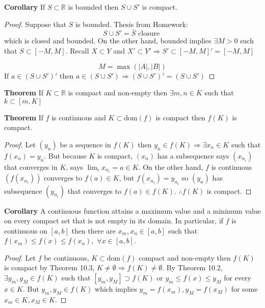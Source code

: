 \documentclass[10pt,letterpaper]{article}
\begin{document}
	\textbf{Corollary } If $S \subset \mathbb{R}$ is bounded then $S \cup S'$ is compact.
	\begin{proof}
		Suppose that $S$ is bounded. Thesis from Homework:
		$$S \cup S' = \bar{S} \text{ closure }$$
		which is closed and bounded. On the other hand, bounded implies $\exists M > 0$
		such that $S \subset [-M, M]$. Recall
		$X \subset Y$ and $X' \subset Y' \Rightarrow S' \subset [-M, M]' = [-M, M]$ \\
		$$M = \max(|A|, |B|)$$
		If $a \in (S \cup S')'$ then $a \in (S \cup S') \Rightarrow (S \cup S')' = (S \cup S')$
	\end{proof}
		
	{\color{purple}\textbf{Theorem} If $K \subset \mathbb{R}$ is compact and non-empty then 
	$\exists m, n \in K$ such that $k \subset [m, K]$}
	
	
	{\color{purple}\textbf{Theorem} If $f$ is continuous and $K \subset \mathrm{dom}(f)$ is compact
	then $f(K)$ is compact.}
	\begin{proof}
	Let $(y_n)$ be a sequence in $f(K)$ then $y_n \in f(K) \Rightarrow \exists x_n \in K$ such that
	$f(x_n) = y_n$. But because $K$ is compact, $(x_n)$ has a subsequence says $(x_{n_i})$ that 
	converges in $K$, says $\displaystyle\lim_{i}x_{n_i} = a \in K$. On the other hand, $f$ is continuous
	$(f(x_{n_i}))$ converges to $f(a) \in K$, but $f(x_{n_i}) = y_{n_i}$ so $(y_n)$ has subsequence
	$(y_{n_i})$ that converges to $f(a) \in f(K)$. $\therefore f(K)$ is compact.
	\end{proof}
	
	{\color{blue}\textbf{Corollary} 
		A continuous function attains a maximum value and a minimum value on every compact set that is not
		empty in its domain. In particular, if $f$ is continuous on $[a, b]$ then there are $x_m, x_n \in 
		[a, b]$ such that $f(x_{m}) \leq f(x) \leq f(x_n), \, \, \forall x \in [a, b]$.
	}
	\begin{proof}
		Let $f$ be continuous, $K \subset \mathrm{dom}(f)$ compact and non-empty then $f(K)$ is compact
		by Theorem 10.3, $K \neq \emptyset \Rightarrow f(K) \neq \emptyset$. By Theorem 10.2, 
		$\exists y_m, y_M \in f(K)$ such that $[y_m, y_M] \supset f(K)$ or $y_m \leq f(x) \leq y_M$ for
		every $x \in K$. But $y_m, y_M \in f(K)$ which implies $y_m = f(x_m), y_M = f(x_M)$ for some
		$x_m \in K, x_M \in K$.
	\end{proof}
	
\end{document}
